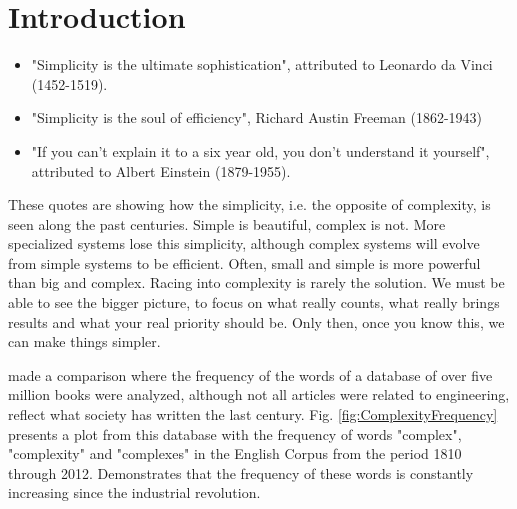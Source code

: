 \section{Introduction}
\begin{itemize}
\item "Simplicity is the ultimate sophistication", attributed to Leonardo da Vinci (1452-1519).
\item "Simplicity is the soul of efficiency", Richard Austin Freeman (1862-1943)
\item "If you can't explain it to a six year old, you don't understand it yourself", attributed to Albert Einstein (1879-1955).
\end{itemize}

These quotes are showing how the simplicity, i.e. the opposite of complexity, is seen along the past centuries. Simple is beautiful, complex is not. 
More specialized systems lose this simplicity, although complex systems will evolve from simple systems to be efficient.
Often, small and simple is more powerful than big and complex. Racing into complexity is rarely the solution. We must be able to see the bigger picture, to focus on what really counts, what really brings results and what your real priority should be. Only then, once you know this, we can make things simpler.

\cite{Davies10} made a comparison where the frequency of the words of a database of over five million books were analyzed, although not all articles were related to engineering, reflect what society has written the last century. Fig. \ref{fig:ComplexityFrequency} presents a plot from this database with the frequency of words "complex", "complexity" and "complexes" in the English Corpus from the period 1810 through 2012. Demonstrates that the frequency of these words is constantly increasing since the industrial revolution.
